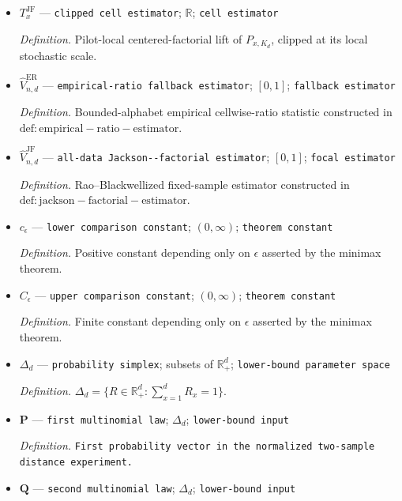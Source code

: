 \documentclass{article}
\begin{document}
\begin{itemize}
  \par\smallskip\noindent\emph{Definition.} Centered factorial lift of the monomial \((q-z)^h\), constructed in \(\mathrm{def:jackson-factorial-estimator}\).
  \item \(T_x^{\mathrm{JF}}\) --- \texttt{clipped cell estimator}; \(\mathbb R\); \texttt{cell estimator}
  \par\smallskip\noindent\emph{Definition.} Pilot-local centered-factorial lift of \(P_{x,K_d}\), clipped at its local stochastic scale.
  \item \(\widehat V_{n,d}^{\mathrm{ER}}\) --- \texttt{empirical-\allowbreak{}ratio fallback estimator}; \([0,1]\); \texttt{fallback estimator}
  \par\smallskip\noindent\emph{Definition.} Bounded-alphabet empirical cellwise-ratio statistic constructed in \(\mathrm{def:empirical-ratio-estimator}\).
  \item \(\widehat V_{n,d}^{\mathrm{JF}}\) --- \texttt{all-\allowbreak{}data Jackson-\allowbreak{}-\allowbreak{}factorial estimator}; \([0,1]\); \texttt{focal estimator}
  \par\smallskip\noindent\emph{Definition.} Rao--Blackwellized fixed-sample estimator constructed in \(\mathrm{def:jackson-factorial-estimator}\).
  \item \(c_\epsilon\) --- \texttt{lower comparison constant}; \((0,\infty)\); \texttt{theorem constant}
  \par\smallskip\noindent\emph{Definition.} Positive constant depending only on \(\epsilon\) asserted by the minimax theorem.
  \item \(C_\epsilon\) --- \texttt{upper comparison constant}; \((0,\infty)\); \texttt{theorem constant}
  \par\smallskip\noindent\emph{Definition.} Finite constant depending only on \(\epsilon\) asserted by the minimax theorem.
  \item \(\Delta_d\) --- \texttt{probability simplex}; subsets of \(\mathbb R_+^d\); \texttt{lower-\allowbreak{}bound parameter space}
  \par\smallskip\noindent\emph{Definition.} \(\Delta_d=\{R\in\mathbb R_+^d:\sum_{x=1}^dR_x=1\}\).
  \item \(\mathbf P\) --- \texttt{first multinomial law}; \(\Delta_d\); \texttt{lower-\allowbreak{}bound input}
  \par\smallskip\noindent\emph{Definition.} \texttt{First probability vector in the normalized two-\allowbreak{}sample distance experiment.}
  \item \(\mathbf Q\) --- \texttt{second multinomial law}; \(\Delta_d\); \texttt{lower-\allowbreak{}bound input}

\end{itemize}
\end{document}
